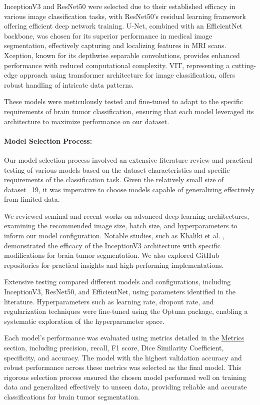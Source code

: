 InceptionV3 and ResNet50 were selected due to their established efficacy in various image classification tasks, with ResNet50's residual learning framework offering efficient deep network training. U-Net, combined with an EfficientNet backbone, was chosen for its superior performance in medical image segmentation, effectively capturing and localizing features in MRI scans. Xception, known for its depthwise separable convolutions, provides enhanced performance with reduced computational complexity. VIT, representing a cutting-edge approach using transformer architecture for image classification, offers robust handling of intricate data patterns.

These models were meticulously tested and fine-tuned to adapt to the specific requirements of brain tumor classification, ensuring that each model leveraged its architecture to maximize performance on our dataset.

\paragraph{Model Selection Process:}
Our model selection process involved an extensive literature review and practical testing of various models based on the dataset characteristics and specific requirements of the classification task. Given the relatively small size of dataset\_19, it was imperative to choose models capable of generalizing effectively from limited data.

We reviewed seminal and recent works on advanced deep learning architectures, examining the recommended image size, batch size, and hyperparameters to inform our model configuration. Notable studies, such as Khaliki et al. \cite{khaliki_brain_2024}, demonstrated the efficacy of the InceptionV3 architecture with specific modifications for brain tumor segmentation. We also explored GitHub repositories for practical insights and high-performing implementations.

Extensive testing compared different models and configurations, including InceptionV3, ResNet50, and EfficientNet, using parameters identified in the literature. Hyperparameters such as learning rate, dropout rate, and regularization techniques were fine-tuned using the Optuna package, enabling a systematic exploration of the hyperparameter space.

Each model's performance was evaluated using metrics detailed in the \hyperref[metrics]{Metrics} section, including precision, recall, F1 score, Dice Similarity Coefficient, specificity, and accuracy. The model with the highest validation accuracy and robust performance across these metrics was selected as the final model. This rigorous selection process ensured the chosen model performed well on training data and generalized effectively to unseen data, providing reliable and accurate classifications for brain tumor segmentation.

